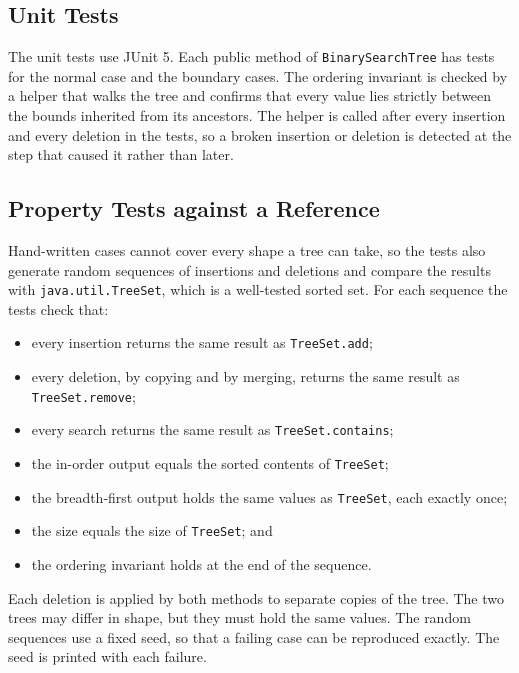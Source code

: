 \subsection{Unit Tests}
The unit tests use JUnit 5. Each public method of \texttt{BinarySearchTree} has tests for the normal case and the boundary cases. The ordering invariant is checked by a helper that walks the tree and confirms that every value lies strictly between the bounds inherited from its ancestors. The helper is called after every insertion and every deletion in the tests, so a broken insertion or deletion is detected at the step that caused it rather than later.

\subsection{Property Tests against a Reference}
Hand-written cases cannot cover every shape a tree can take, so the tests also generate random sequences of insertions and deletions and compare the results with \texttt{java.util.TreeSet}, which is a well-tested sorted set. For each sequence the tests check that:
\begin{itemize}
    \item every insertion returns the same result as \texttt{TreeSet.add};
    \item every deletion, by copying and by merging, returns the same result as \texttt{TreeSet.remove};
    \item every search returns the same result as \texttt{TreeSet.contains};
    \item the in-order output equals the sorted contents of \texttt{TreeSet};
    \item the breadth-first output holds the same values as \texttt{TreeSet}, each exactly once;
    \item the size equals the size of \texttt{TreeSet}; and
    \item the ordering invariant holds at the end of the sequence.
\end{itemize}
Each deletion is applied by both methods to separate copies of the tree. The two trees may differ in shape, but they must hold the same values. The random sequences use a fixed seed, so that a failing case can be reproduced exactly. The seed is printed with each failure.

